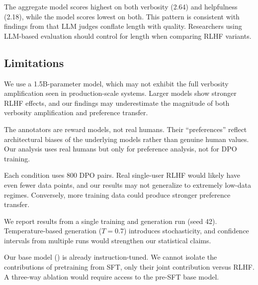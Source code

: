 The aggregate model scores highest on both verbosity (2.64) and helpfulness (2.18), while the \beaver model scores lowest on both. This pattern is consistent with findings from \citet{saito2023verbosity} that LLM judges conflate length with quality. Researchers using LLM-based evaluation should control for length when comparing RLHF variants.

\subsection{Limitations}
\label{sec:limitations}

 We use a 1.5B-parameter model, which may not exhibit the full verbosity amplification seen in production-scale systems. Larger models show stronger RLHF effects, and our findings may underestimate the magnitude of both verbosity amplification and preference transfer.

 The \personalllm annotators are reward models, not real humans. Their ``preferences'' reflect architectural biases of the underlying models rather than genuine human values. Our \prism analysis uses real humans but only for preference analysis, not for DPO training.

 Each condition uses 800 DPO pairs. Real single-user RLHF would likely have even fewer data points, and our results may not generalize to extremely low-data regimes. Conversely, more training data could produce stronger preference transfer.

 We report results from a single training and generation run (seed 42). Temperature-based generation ($T{=}0.7$) introduces stochasticity, and confidence intervals from multiple runs would strengthen our statistical claims.

 Our base model (\qwen) is already instruction-tuned. We cannot isolate the contributions of pretraining from SFT, only their joint contribution versus RLHF. A three-way ablation would require access to the pre-SFT base model.
